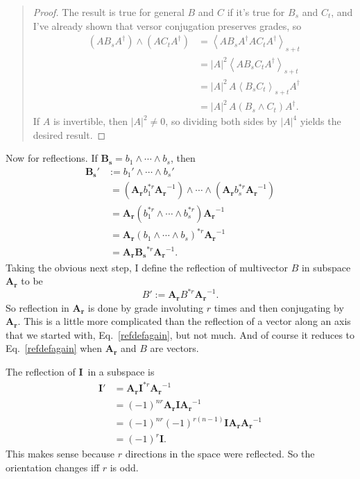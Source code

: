 \documentclass{utarticle}
\newcommand{\bl}[1]{\ensuremath{\bm{#1}}}
\newcommand{\I}{\bl{I}}
\DeclareMathOperator{\out}{\wedge}
\newcommand{\grinv}[2][]{\ensuremath{#2^{*#1}}}
\newcommand{\rev}[1]{\ensuremath{#1^\dagger}}
\newcommand{\grade}[2][]{\ensuremath{\left\langle #2 \right\rangle_{#1}}}
\newcommand{\bp}{\begin{quotation} \begin{proof}}
\newcommand{\ep}{\end{proof} \end{quotation}}
\begin{document}
\bp
The result is true for general $B$ and $C$ if it's true for $B_s$ and $C_t$, and I've already shown that
versor conjugation preserves grades, so
\begin{align}
(A B_s \rev{A}) \out (A C_t \rev{A}) & = \grade[s+t]{A B_s \rev{A} A C_t \rev{A}} \nonumber \\
                                                            & = |A|^2 \grade[s+t]{A B_s C_t \rev{A}} \nonumber \\
                                                            & = |A|^2 \, A \grade[s+t]{B_s C_t} \rev{A} \nonumber \\
                                                            & = |A|^2 \, A (B_s \out C_t) \rev{A}.
\end{align}
If $A$ is invertible, then $|A|^2 \neq 0$, so dividing both sides by $|A|^4$ yields the desired result. 
\ep
Now for reflections.  If $\bl{B_s} =  b_1 \out  \dotsb \out b_s$, then 
\begin{align}
\bl{B_s}' & := b_1' \out \dotsb \out b_s' \nonumber \\
 & \ = \left(\bl{A_r} \grinv[r]{b_1} \bl{A_r}^{-1}\right) \out \dotsb \out \left(\bl{A_r} 
        \grinv[r]{b_s} \bl{A_r}^{-1}\right) \nonumber \\
  & \ = \bl{A_r}  (\grinv[r]{b_1} \out \dotsb \out \grinv[r]{b_s}) \bl{A_r}^{-1} \nonumber \\
  & \ = \bl{A_r}  \grinv[r]{(b_1 \out \dotsb \out b_s)} \bl{A_r}^{-1} \nonumber \\
  & \ = \bl{A_r} \grinv[r]{\bl{B_s}} \bl{A_r}^{-1}.
\end{align}
Taking the obvious next step, I define the reflection of multivector $B$ in subspace \bl{A_r} to be
\begin{equation} B' := \bl{A_r} \grinv[r]{B} \bl{A_r}^{-1}. \end{equation}
So reflection in \bl{A_r} is done by grade involuting $r$ times and then conjugating by \bl{A_r}.  
This is a little more complicated than the reflection of a vector 
along an axis that we started with, Eq.~\eqref{refdefagain}, but not much.  And of course it reduces
to Eq.~\eqref{refdefagain} when \bl{A_r} and $B$ are vectors.

The reflection of \I\ in a subspace is
\begin{align} 
\I' & = \bl{A_r} \grinv[r]{\I} \bl{A_r}^{-1} \nonumber \\
    & = (-1)^{nr} \bl{A_r} \I \bl{A_r}^{-1} \nonumber \\
    & =  (-1)^{nr} (-1)^{r(n-1)} \I \bl{A_r} \bl{A_r}^{-1} \nonumber \\
    & = (-1)^r \I .
\label{reflectI}
\end{align}
This makes sense because $r$ directions in the space were reflected.  So
the orientation changes iff $r$ is odd.
\end{document}
